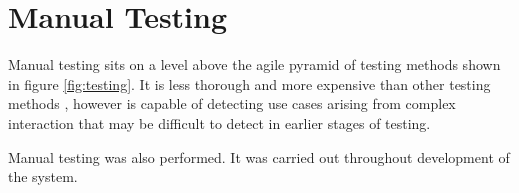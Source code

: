 \section{Manual Testing}

Manual testing sits on a level above the agile pyramid of testing methods shown in figure \ref{fig:testing}. It is less thorough and more expensive than other testing methods \cite{pyramid}, however is capable of detecting use cases arising from complex interaction that may be difficult to detect in earlier stages of testing.

Manual testing was also performed. It was carried out throughout development of the system. 
